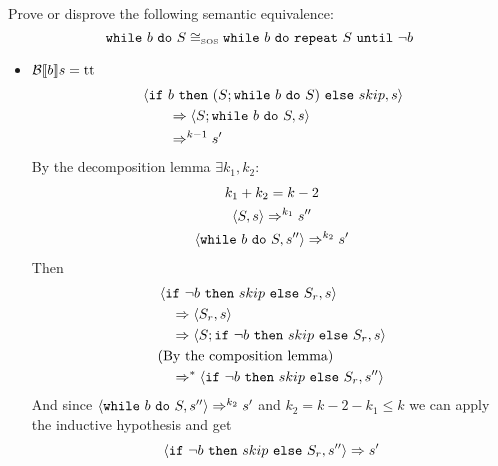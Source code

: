 \begin{exercise}{
    Prove or disprove the following semantic equivalence:
    \[ \texttt{while}\ b\ \texttt{do}\ S \cong_{\text{\tiny SOS}} \texttt{while}\ b\ \texttt{do}\ \texttt{repeat}\ S\ \texttt{until}\ \neg b  \]\vspace*{-0.6cm}
}
\begin{itemize}
\begin{itemize}
\begin{itemize}
\begin{gather*}
                        \instr{\wif{b}{(S; \wwhile{b}{S})}{skip}}{s}
                        \Rightarrow
                        \instr{skip}{s}
                        \Rightarrow s
                        \\
                        \instr{\wif{\neg b}{skip}{S_r}}{s}
                        \Rightarrow
                        \instr{skip}{s}
                        \Rightarrow s
                    \end{gather*}
                    \item $\mathcal{B} \llbracket  b \rrbracket s = \text{tt}$
                        \begin{align*}
                            &\left<\texttt{if}\ b\ \texttt{then}\ (S; \texttt{while}\ b\ \texttt{do}\ S)\ \texttt{else}\ skip, s\right>
                            \\&\qquad\Rightarrow \left<S; \texttt{while}\ b\ \texttt{do}\ S, s\right>
                            \\&\qquad\Rightarrow^{k-1} s'
                        \end{align*}
                        By the decomposition lemma $\exists k_1, k_2 :$
                        \begin{gather*}
                            k_1 + k_2 = k - 2 \\
                            \left<S, s\right> \Rightarrow^{k_1} s'' \\
                            \left<\texttt{while}\ b\ \texttt{do}\ S, s''\right> \Rightarrow^{k_2} s'
                        \end{gather*}
                        Then
                        \begin{align*}
                            &\left<\texttt{if}\ \neg b\ \texttt{then}\ skip\ \texttt{else}\ S_r, s\right>
                            \\&\quad\Rightarrow \left<S_r, s\right>
                            \\&\quad\Rightarrow \left<S; \texttt{if}\ \neg b\ \texttt{then}\ skip\ \texttt{else}\ S_r, s\right>
                            \\&\text{(By the composition lemma)}
                            \\&\quad\Rightarrow^* \left<\texttt{if}\ \neg b\ \texttt{then}\ skip\ \texttt{else}\ S_r, s''\right>
                        \end{align*}
                        And since $\left<\texttt{while}\ b\ \texttt{do}\ S, s''\right> \Rightarrow^{k_2} s'$ and $k_2 = k - 2 - k_1 \leq k$  we can apply the inductive hypothesis and get
                        \[ \left<\texttt{if}\ \neg b\ \texttt{then}\ skip\ \texttt{else}\ S_r, s''\right> \Rightarrow s' \]
                \end{itemize}
            \end{itemize}

\end{itemize}
\end{exercise}
